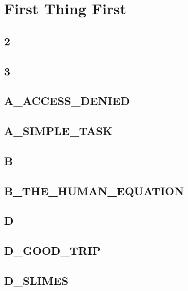 \section{First Thing First}
\subsection{2}
\raggedbottom
\hrulefill

\subsection{3}
\raggedbottom
\hrulefill

\subsection{A_ACCESS_DENIED}
\raggedbottom
\hrulefill

\subsection{A_SIMPLE_TASK}
\raggedbottom
\hrulefill

\subsection{B}
\raggedbottom
\hrulefill

\subsection{B_THE_HUMAN_EQUATION}
\raggedbottom
\hrulefill

\subsection{D}
\raggedbottom
\hrulefill

\subsection{D_GOOD_TRIP}
\raggedbottom
\hrulefill

\subsection{D_SLIMES}
\raggedbottom
\hrulefill

